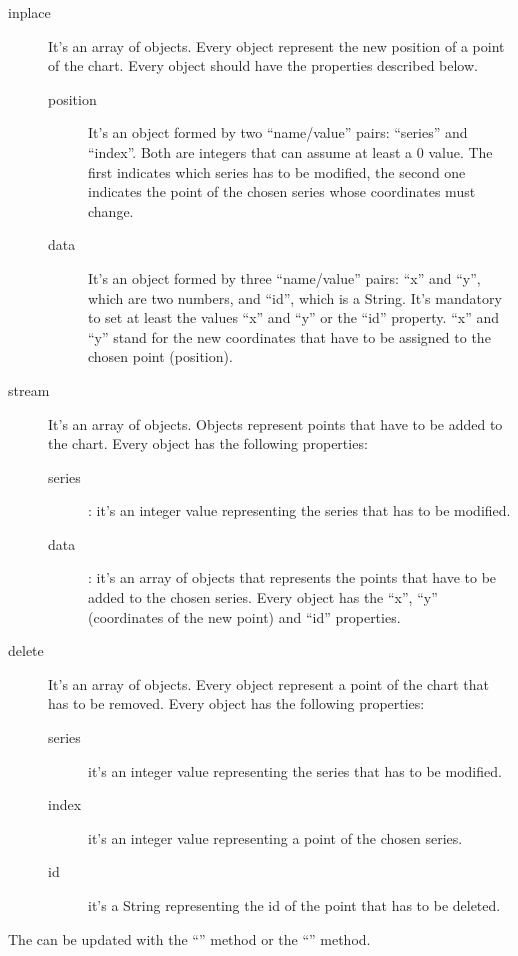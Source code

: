 			\begin{description}
				\item[inplace] It's an array of objects. Every object represent the new position of a point of the chart. Every object should have the properties described below.
				\begin{description}
					\item[position] It's an object formed by two “name/value” pairs: “series” and “index”. Both are integers that can assume at least a 0 value. The first indicates which series has to be modified, the second one indicates the point of the chosen series whose coordinates must change. 
					\item[data] It's an object formed by three “name/value” pairs: “x” and “y”, which are two numbers, and “id”, which is a String. It's mandatory to set at least the values “x” and “y” or the “id” property. “x” and “y” stand for the new coordinates that have to be assigned to the chosen point (position).
				\end{description}
				\item[stream] It's an array of objects. Objects represent points that have to be added to the chart. Every object has the following properties:
				\begin{description}
					\item[series]: it's an integer value representing the series that has to be modified.
					\item[data]: it's an array of objects that represents the points that have to be added to the chosen series. Every object has the “x”, “y” (coordinates of the new point) and “id” properties.
				\end{description}
				\item[delete] It's an array of objects. Every object represent a point of the chart that has to be removed. Every object has the following properties:
				\begin{description}
					\item[series] it's an integer value representing the series that has to be modified.
					\item[index] it's an integer value representing a point of the chosen series.
					\item[id] it's a String representing the id of the point that has to be deleted.
				\end{description}
			\end{description}
			The  can be updated with the “” method or the “” method.\\
